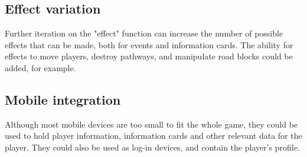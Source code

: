 \subsection{Effect variation}
Further iteration on the "effect" function can increase the number of possible effects that can be made, both for events and information cards. The ability for effects to move players, destroy pathways, and manipulate road blocks could be added, for example.\\

\subsection{Mobile integration}
Although most mobile devices are too small to fit the whole game, they could be used to hold player information, information cards and other relevant data for the player. They could also be used as log-in devices, and contain the player's profile.



